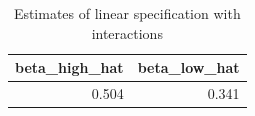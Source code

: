\begin{table}[ht]
\centering
\begin{tabular}{rr}
  \hline
beta\_high\_hat & beta\_low\_hat \\ 
  \hline
0.504 & 0.341 \\ 
   \hline
\end{tabular}
\caption{Estimates of linear specification with interactions} 
\label{tab:int-syn-beta}
\end{table}
